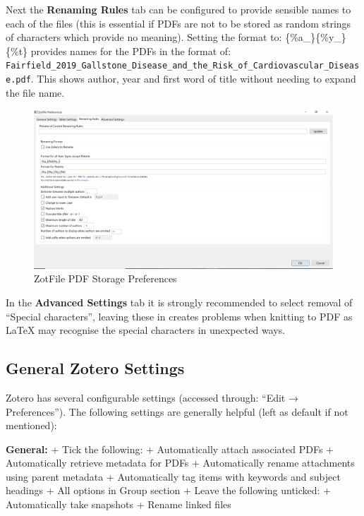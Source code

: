 \documentclass[]{book}
\begin{document}
Next the \textbf{Renaming Rules} tab can be configured to provide sensible names to each of the files (this is essential if PDFs are not to be stored as random strings of characters which provide no meaning). Setting the format to: \{\%a\_\}\{\%y\_\}\{\%t\} provides names for the PDFs in the format of: \texttt{Fairfield\_2019\_Gallstone\_Disease\_and\_the\_Risk\_of\_Cardiovascular\_Disease.pdf}. This shows author, year and first word of title without needing to expand the file name.

\begin{figure}
\includegraphics[width=44.47in]{img/zotfile_renaming} \caption{ZotFile PDF Storage Preferences}\label{fig:zotfile-renaming}
\end{figure}

In the \textbf{Advanced Settings} tab it is strongly recommended to select removal of ``Special characters'', leaving these in creates problems when knitting to PDF as LaTeX may recognise the special characters in unexpected ways.

\hypertarget{general-zotero-settings}{%
\subsection{General Zotero Settings}\label{general-zotero-settings}}

Zotero has several configurable settings (accessed through: ``Edit → Preferences''). The following settings are generally helpful (left as default if not mentioned):

\textbf{General:}
+ Tick the following:
+ Automatically attach associated PDFs
+ Automatically retrieve metadata for PDFs
+ Automatically rename attachments using parent metadata
+ Automatically tag items with keywords and subject headings
+ All options in Group section
+ Leave the following unticked:
+ Automatically take snapshots
+ Rename linked files
\end{document}
